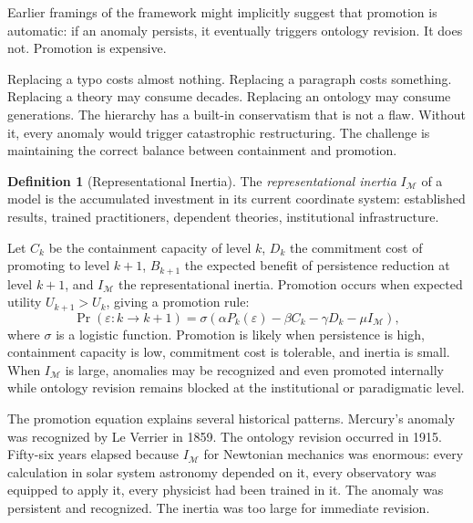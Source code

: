\documentclass[12pt,oneside]{book}
\theoremstyle{plain}
\theoremstyle{definition}
\newtheorem{definition}[theorem]{Definition}
\theoremstyle{remark}
\newcommand{\M}{\mathcal{M}}
\newcommand{\eps}{\varepsilon}
\newcommand{\1}{\mathbf{1}}
\begin{document}
Earlier framings of the framework might implicitly suggest that promotion is automatic: if an anomaly persists, it eventually triggers ontology revision. It does not. Promotion is expensive.

Replacing a typo costs almost nothing. Replacing a paragraph costs something. Replacing a theory may consume decades. Replacing an ontology may consume generations. The hierarchy has a built-in conservatism that is not a flaw. Without it, every anomaly would trigger catastrophic restructuring. The challenge is maintaining the correct balance between containment and promotion.

\begin{definition}[Representational Inertia]
The \emph{representational inertia} $I_\M$ of a model is the accumulated investment in its current coordinate system: established results, trained practitioners, dependent theories, institutional infrastructure.
\end{definition}

\begin{derivbox}[frametitle={Derivation 3: Promotion Through the Repair Hierarchy}]
Let $C_k$ be the containment capacity of level $k$, $D_k$ the commitment cost of promoting to level $k+1$, $B_{k+1}$ the expected benefit of persistence reduction at level $k+1$, and $I_\M$ the representational inertia. Promotion occurs when expected utility $U_{k+1} > U_k$, giving a promotion rule:
\[
\Pr(\eps : k \to k+1) = \sigma\!\left(\alpha P_k(\eps) - \beta C_k - \gamma D_k - \mu I_\M\right),
\]
where $\sigma$ is a logistic function. Promotion is likely when persistence is high, containment capacity is low, commitment cost is tolerable, and inertia is small. When $I_\M$ is large, anomalies may be recognized and even promoted internally while ontology revision remains blocked at the institutional or paradigmatic level.
\end{derivbox}

The promotion equation explains several historical patterns. Mercury's anomaly was recognized by Le Verrier in 1859. The ontology revision occurred in 1915. Fifty-six years elapsed because $I_\M$ for Newtonian mechanics was enormous: every calculation in solar system astronomy depended on it, every observatory was equipped to apply it, every physicist had been trained in it. The anomaly was persistent and recognized. The inertia was too large for immediate revision.
\end{document}
